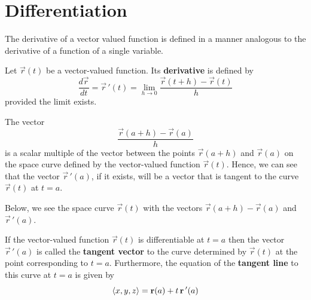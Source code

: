 \documentclass[handout]{ximera}
\begin{document}
\section{Differentiation}
The derivative of a vector valued function is defined in a manner analogous to the derivative of a function of a single variable.

\begin{definition}
Let $\vec r(t)$ be a vector-valued function. Its \textbf{derivative} is defined by
\[
\frac{d\vec r}{dt} = \vec r\, '(t) = \lim_{h \to 0} \frac{\vec r(t+h) - \vec r(t)}{h}
\]
provided the limit exists.
\end{definition}

\begin{remark}
The vector 
\[
\frac{\vec r(a+h) - \vec r(a)}{h}
\]
is a scalar multiple of the vector between the points $\vec r(a+h)$ and $\vec r(a)$ on the space 
curve defined by the vector-valued function $\vec r(t)$. 
Hence, we can see that the vector $\vec r\,'(a)$, if it exists, 
will be a vector that is tangent to the curve $\vec r(t)$ at $t = a$. 
\end{remark}
Below, we see the space curve $\vec r(t)$ with the vectors $\vec r(a+h) - \vec r(a)$ and $\vec r\,'(a)$.
\begin{image}
\end{image}

\begin{definition}
If the vector-valued function $\vec r(t)$ is differentiable at $t = a$ then the vector $\vec r\,'(a)$ is called the 
\textbf{tangent vector} to the curve determined by $\vec r(t)$ at the point corresponding to $t = a$. 
Furthermore, the equation of the \textbf{tangent line} to this curve at $ t= a$ is given by
\[
\left\langle x, y, z\right\rangle = \mathbf r(a) + t\,\mathbf r\,'(a)
\]
\end{definition}
\end{document}
